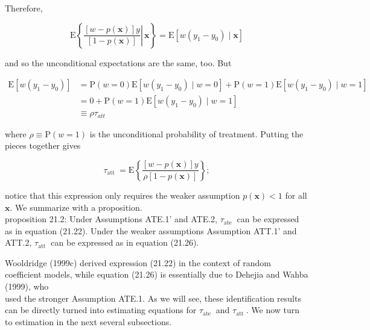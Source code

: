 \documentclass[10pt]{article}
\begin{document}
Therefore,


\begin{equation*}
\mathrm{E}\left\{\left.\frac{[w-p(\mathbf{x})] y}{[1-p(\mathbf{x})]} \right\rvert\, \mathbf{x}\right\}=\mathrm{E}\left[w\left(y_{1}-y_{0}\right) \mid \mathbf{x}\right] \tag{21.24}
\end{equation*}


and so the unconditional expectations are the same, too. But


\begin{align*}
\mathrm{E}\left[w\left(y_{1}-y_{0}\right)\right] & =\mathrm{P}(w=0) \mathrm{E}\left[w\left(y_{1}-y_{0}\right) \mid w=0\right]+\mathrm{P}(w=1) \mathrm{E}\left[w\left(y_{1}-y_{0}\right) \mid w=1\right] \\
& =0+\mathrm{P}(w=1) \mathrm{E}\left[w\left(y_{1}-y_{0}\right) \mid w=1\right] \\
& \equiv \rho \tau_{a t t} \tag{21.25}
\end{align*}


where $\rho \equiv \mathrm{P}(w=1)$ is the unconditional probability of treatment. Putting the pieces together gives


\begin{equation*}
\tau_{\text {att }}=\mathrm{E}\left\{\frac{[w-p(\mathbf{x})] y}{\rho[1-p(\mathbf{x})]}\right\} ; \tag{21.26}
\end{equation*}


notice that this expression only requires the weaker assumption $p(\mathbf{x})<1$ for all $\mathbf{x}$. We summarize with a proposition.\\
proposition 21.2: Under Assumptions ATE.1' and ATE.2, $\tau_{\text {ate }}$ can be expressed as in equation (21.22). Under the weaker assumptions Assumption ATT.1' and ATT.2, $\tau_{\text {att }}$ can be expressed as in equation (21.26).

Wooldridge (1999c) derived expression (21.22) in the context of random coefficient models, while equation (21.26) is essentially due to Dehejia and Wahba (1999), who\\
used the stronger Assumption ATE.1. As we will see, these identification results can be directly turned into estimating equations for $\tau_{\text {ate }}$ and $\tau_{\text {att }}$. We now turn to estimation in the next several subsections.
\end{document}
